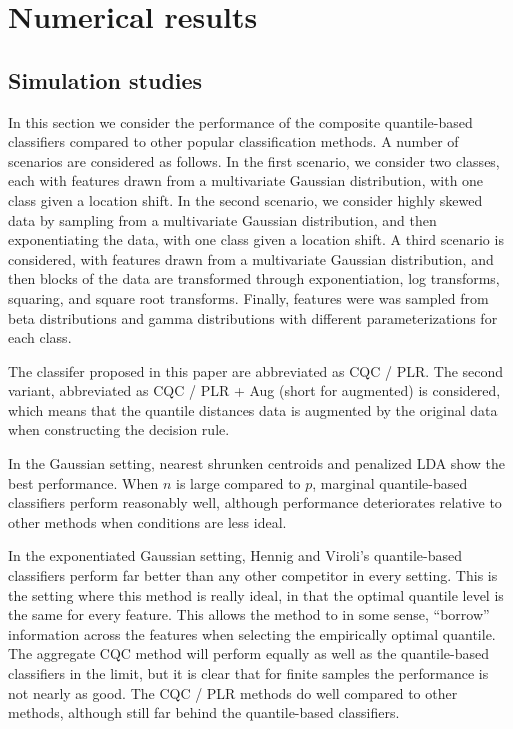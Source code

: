 

\section{Numerical results}
\label{sec:numerical-results}


\subsection{Simulation studies}
\label{sec: simulation}

In this section we consider the performance of the composite quantile-based
classifiers compared to other popular classification methods.  A number of
scenarios are considered as follows.  In the first scenario, we consider two
classes, each with features drawn from a multivariate Gaussian distribution,
with one class given a location shift.  In the second scenario, we consider
highly skewed data by sampling from a multivariate Gaussian distribution, and
then exponentiating the data, with one class given a location shift.  A third
scenario is considered, with features drawn from a multivariate Gaussian
distribution, and then blocks of the data are transformed through
exponentiation, log transforms, squaring, and square root transforms.  Finally,
features were was sampled from beta distributions and gamma distributions with
different parameterizations for each class.

The classifer proposed in this paper are abbreviated as CQC / PLR.  The second
variant, abbreviated as CQC / PLR + Aug (short for augmented) is considered,
which means that the quantile distances data is augmented by the original data
when constructing the decision rule.

In the Gaussian setting, nearest shrunken centroids and penalized LDA show the
best performance.  When $n$ is large compared to $p$, marginal quantile-based
classifiers perform reasonably well, although performance deteriorates relative
to other methods when conditions are less ideal.

In the exponentiated Gaussian setting, Hennig and Viroli's quantile-based
classifiers perform far better than any other competitor in every setting.  This
is the setting where this method is really ideal, in that the optimal quantile
level is the same for every feature.  This allows the method to in some sense,
``borrow'' information across the features when selecting the empirically
optimal quantile.  The aggregate CQC method will perform equally as well as the
quantile-based classifiers in the limit, but it is clear that for finite samples
the performance is not nearly as good.  The CQC / PLR methods do well compared
to other methods, although still far behind the quantile-based classifiers.

